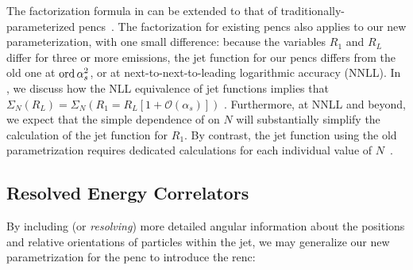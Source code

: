 The factorization formula in  can be extended to that of traditionally-parameterized \glspl{penc}~\cite{Chen:2020vvp}.
%
The factorization for existing \glspl{penc} also applies to our new parameterization, with one small difference:
%
because the variables $R_1$ and $R_L$ differ for three or more emissions, the jet function for our \glspl{penc} differs from the old one at $\operatorname{ord}{\alpha_s^2}$, or at next-to-next-to-leading logarithmic accuracy (NNLL).
%
In , we discuss how the NLL equivalence of jet functions implies that $
    \Sigma_N
    (R_L)
    =
    \Sigma_N(
    R_1 = R_L[
        1
        +
        \mathcal{O}
        (
        \alpha_s
        )
    ]
    )
$%
.
%
Furthermore, at NNLL and beyond, we expect that the simple dependence of  on $N$ will substantially simplify the calculation of the jet function for $R_1$.
%
By contrast, the jet function using the old parametrization requires dedicated calculations for each individual value of $N$~\cite{Dixon:2019uzg,Chen:2023zlx}.









\subsection{Resolved Energy Correlators}
\label{sec:enc-resolved}

By including (or \emph{resolving}) more detailed angular information about the positions and relative orientations of particles within the jet, we may generalize our new parametrization for the \gls{penc} to introduce the \gls{renc}:



